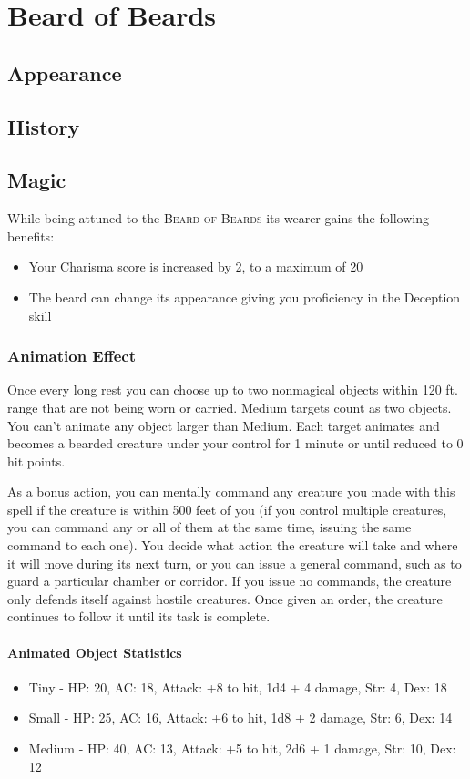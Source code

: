 \documentclass[letterpaper,openany,oneside,twocolumn]{book}
\begin{document}
\chapter*{Beard of Beards}
\section*{Appearance}

\section*{History}

\section*{Magic}
While being attuned to the \textsc{Beard of Beards} its wearer gains the following benefits:
\begin{itemize}
	\item Your Charisma score is increased by 2, to a maximum of 20
	\item The beard can change its appearance giving you proficiency in the Deception skill
\end{itemize}
\subsection*{Animation Effect}
Once every long rest you can choose up to two nonmagical objects within 120 ft. range that are not being worn or carried. Medium targets count as two objects. You can't animate any object larger than Medium. Each target animates and becomes a bearded creature under your control for 1 minute or until reduced to 0 hit points.
	
As a bonus action, you can mentally command any creature you made with this spell if the creature is within 500 feet of you (if you control multiple creatures, you can command any or all of them at the same time, issuing the same command to each one). You decide what action the creature will take and where it will move during its next turn, or you can issue a general command, such as to guard a particular chamber or corridor. If you issue no commands, the creature only defends itself against hostile creatures. Once given an order, the creature continues to follow it until its task is complete.
	
\subsubsection*{Animated Object Statistics}
\begin{itemize}
	\item Tiny - HP: 20, AC: 18, Attack: +8 to hit, 1d4 + 4 damage, Str: 4, Dex: 18
	\item Small - HP: 25, AC: 16, Attack: +6 to hit, 1d8 + 2 damage, Str: 6, Dex: 14
	\item Medium - HP: 40, AC: 13, Attack: +5 to hit, 2d6 + 1 damage, Str: 10, Dex: 12
\end{itemize}
	
\end{document}
